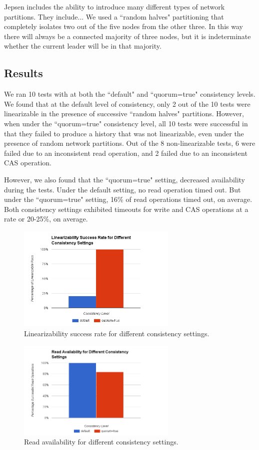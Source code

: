 \documentclass[12pt,conference]{IEEEtran}
\begin{document}
Jepsen includes the ability to introduce many different types of network partitions. They include... We used a ``random halves" partitioning that completely isolates two out of the five nodes from the other three. In this way there will always be a connected majority of three nodes, but it is indeterminate whether the current leader will be in that majority.

\subsection{Results}
We ran 10 tests with at both the ``default" and ``quorum=true" consistency levels. We found that at the default level of consistency, only 2 out of the 10 tests were linearizable in the presence of successive ``random halves" partitions. However, when under the ``quorum=true" consistency level, all 10 tests were successful in that they failed to produce a history that was not linearizable, even under the presence of random network partitions. Out of the 8 non-linearizable tests, 6 were failed due to an inconsistent read operation, and 2 failed due to an inconsistent CAS operation.

However, we also found that the ``quorum=true" setting, decreased availability during the tests. Under the default setting, no read operation timed out. But under the ``quorum=true" setting, 16\% of read operations timed out, on average. Both consistency settings exhibited timeouts for write and CAS operations at a rate or 20-25\%, on average.

\begin{figure}[!t]
\centering
\includegraphics[width=3in]{images/overallresults}
\caption{Linearizability success rate for different consistency settings.}
\label{overallResultsFigure}
\end{figure}

\begin{figure}[!t]
\centering
\includegraphics[width=3in]{images/availabilityresults}
\caption{Read availability for different consistency settings.}
\label{availabilityResultsFigure}
\end{figure}
\end{document}
